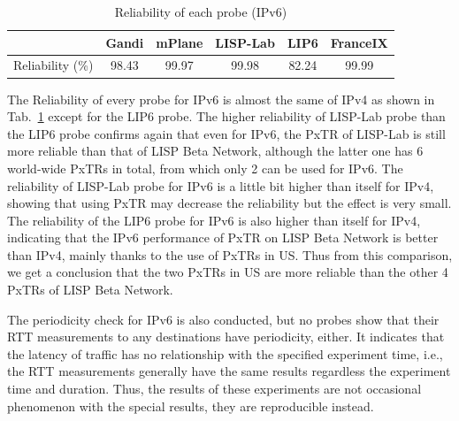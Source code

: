 \begin{table}[!tb]
	\centering
	\caption{Reliability of each probe (IPv6)}
	\label{reliability_v6_2016}{
		\begin{tabular}{@{}c|c|c|c|c|c@{}}
			\hline\hline
			& Gandi  & mPlane  & LISP-Lab  & LIP6 &  FranceIX \\ \hline
			Reliability (\%) &  98.43 & 99.97 & 99.98 & 82.24 & 99.99     	\\  \hline \hline                
		\end{tabular}
	}
\end{table}

The Reliability of every probe for IPv6 is almost the same of IPv4 as shown in Tab.~\ref{reliability_v6_2016} except for the LIP6 probe. The higher reliability of LISP-Lab probe than the LIP6 probe confirms again that even for IPv6, the PxTR of LISP-Lab is still more reliable than that of LISP Beta Network, although the latter one has 6 world-wide PxTRs in total, from which only 2 can be used for IPv6. The reliability of LISP-Lab probe for IPv6 is a little bit higher than itself for IPv4, showing that using PxTR may decrease the reliability but the effect is very small. The reliability of the LIP6 probe for IPv6 is also higher than itself for IPv4, indicating that the IPv6 performance of PxTR on LISP Beta Network is better than IPv4, mainly thanks to the use of PxTRs in US. Thus from this comparison, we get a conclusion that the two PxTRs in US are more reliable than the other 4 PxTRs of LISP Beta Network.

The periodicity check for IPv6 is also conducted, but no probes show that their RTT measurements to any destinations have periodicity, either. It indicates that the latency of traffic has no relationship with the specified experiment time, i.e., the RTT measurements generally have the same results regardless the experiment time and duration. Thus, the results of these experiments are not occasional phenomenon with the special results, they are reproducible instead.



